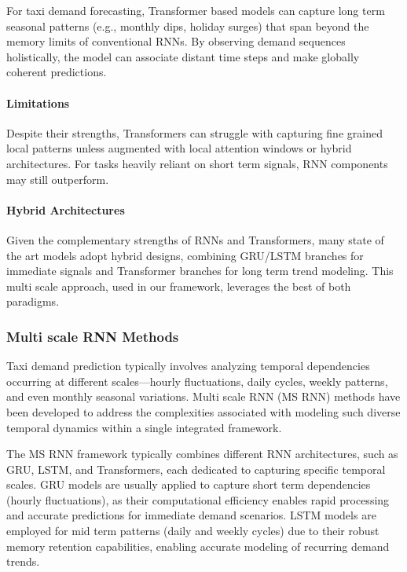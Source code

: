 \documentclass{article}
\begin{document}
For taxi demand forecasting, Transformer based models can capture long term seasonal patterns (e.g., monthly dips, holiday surges) that span beyond the memory limits of conventional RNNs. By observing demand sequences holistically, the model can associate distant time steps and make globally coherent predictions.

\paragraph{Limitations}

Despite their strengths, Transformers can struggle with capturing fine grained local patterns unless augmented with local attention windows or hybrid architectures. For tasks heavily reliant on short term signals, RNN components may still outperform.

\paragraph{Hybrid Architectures}

Given the complementary strengths of RNNs and Transformers, many state of the art models adopt hybrid designs, combining GRU/LSTM branches for immediate signals and Transformer branches for long term trend modeling. This multi scale approach, used in our framework, leverages the best of both paradigms.




\subsubsection{Multi scale RNN Methods}

Taxi demand prediction typically involves analyzing temporal dependencies occurring at different scales—hourly fluctuations, daily cycles, weekly patterns, and even monthly seasonal variations. Multi scale RNN (MS RNN) methods have been developed to address the complexities associated with modeling such diverse temporal dynamics within a single integrated framework.

The MS RNN framework typically combines different RNN architectures, such as GRU, LSTM, and Transformers, each dedicated to capturing specific temporal scales. GRU models are usually applied to capture short term dependencies (hourly fluctuations), as their computational efficiency enables rapid processing and accurate predictions for immediate demand scenarios. LSTM models are employed for mid term patterns (daily and weekly cycles) due to their robust memory retention capabilities, enabling accurate modeling of recurring demand trends.
\end{document}
